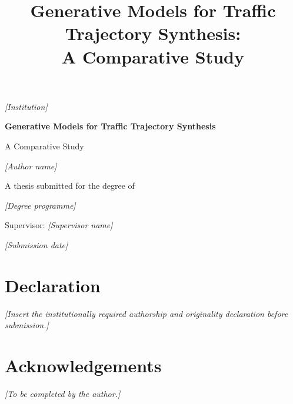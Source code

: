 \documentclass[12pt,a4paper,oneside]{report}
\title{Generative Models for Traffic Trajectory Synthesis:\\A Comparative Study}
\author{\placeholder{Author name}}
\date{\placeholder{Submission date}}
\newcommand{\placeholder}[1]{\textit{[#1]}}
\begin{document}
\begin{titlepage}
\centering
\vspace*{22mm}
{\Large \placeholder{Institution}\par}
\vspace{18mm}
{\Huge\bfseries Generative Models for Traffic Trajectory Synthesis\par}
\vspace{4mm}
{\LARGE A Comparative Study\par}
\vspace{22mm}
{\Large \placeholder{Author name}\par}
\vfill
{\large A thesis submitted for the degree of\par}
\vspace{3mm}
{\large \placeholder{Degree programme}\par}
\vspace{12mm}
{\large Supervisor: \placeholder{Supervisor name}\par}
\vspace{18mm}
{\large \placeholder{Submission date}\par}
\end{titlepage}


\chapter*{Declaration}
\placeholder{Insert the institutionally required authorship and originality declaration before submission.}

\chapter*{Acknowledgements}
\placeholder{To be completed by the author.}
\end{document}
